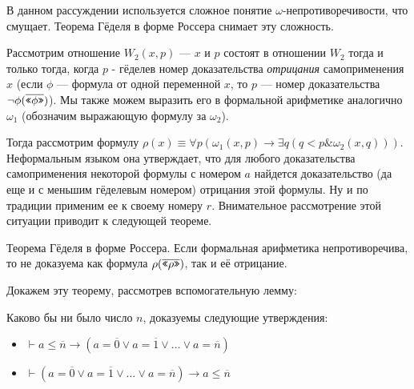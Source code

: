 В данном рассуждении используется сложное понятие
$\omega$-непротиворечивости, что смущает. Теорема Гёделя в форме 
Россера снимает эту сложность.

Рассмотрим отношение $W_2 (x,p)$ --- $x$ и $p$ состоят в отношении $W_2$ тогда и только тогда, когда
$p$ - гёделев номер доказательства \emph{отрицания} самоприменения $x$ (если $\phi$ --- формула от
одной переменной $x$, то $p$ --- номер доказательства $\neg \phi(\overline{\texttt{<<}\phi\texttt{>>}})$). 
Мы также можем выразить его в формальной арифметике аналогично $\omega_1$
(обозначим выражающую формулу за $\omega_2$).

Тогда рассмотрим формулу $\rho(x) \equiv \forall p (\omega_1 (x,p) \rightarrow \exists q (q < p \& \omega_2 (x,q)))$.
Неформальным языком она утверждает, что для любого доказательства самоприменения некоторой 
формулы с номером $a$ найдется доказательство (да еще и с меньшим гёделевым номером) 
отрицания этой формулы. Ну и по традиции применим ее к своему номеру $r$. 
Внимательное рассмотрение этой ситуации приводит к следующей теореме.

\begin{theorem}{Теорема Гёделя в форме Россера.}
Если формальная арифметика непротиворечива, то не доказуема как формула $\rho(\overline{\texttt{<<}\rho\texttt{>>}})$, так и её отрицание.
\end{theorem}

Докажем эту теорему, рассмотрев вспомогательную лемму:
\begin{lemma}
Каково бы ни было число $n$, доказуемы следующие утверждения:
\begin{itemize}
\item $\vdash a \le \overline{n} \rightarrow (a=\overline{0} \vee a=\overline{1} \vee \dots \vee a=\overline{n})$ 
\item $\vdash (a=\overline{0} \vee a=\overline{1} \vee \dots \vee a=\overline{n}) \rightarrow a\le\overline{n}$ 
\end{itemize}
\end{lemma}

